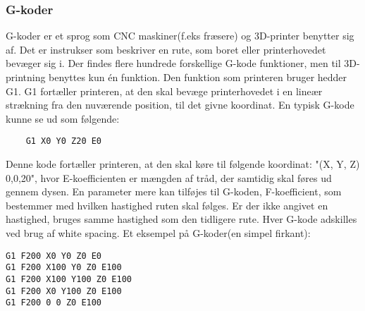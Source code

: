 
\subsubsection{G-koder} %
\label{ssub:g_koder}

G-koder er et sprog som CNC maskiner(f.eks fræsere) og 3D-printer benytter sig af. Det er instrukser som beskriver en rute, som boret eller printerhovedet bevæger sig i. \cite{_g-code_2013} 
Der findes flere hundrede forskellige G-kode funktioner, men til 3D-printning benyttes kun én funktion. Den funktion som printeren bruger hedder G1. G1 fortæller printeren, at den skal bevæge printerhovedet i en lineær strækning fra den nuværende position, til det givne koordinat.
En typisk G-kode kunne se ud som følgende: 

\begin{verbatim}
	G1 X0 Y0 Z20 E0
\end{verbatim}


Denne kode fortæller printeren, at den skal køre til følgende koordinat: "(X, Y, Z) 0,0,20", hvor E-koefficienten er mængden af tråd, der samtidig skal føres ud gennem dysen.
En parameter mere kan tilføjes til G-koden, F-koefficient, som bestemmer med hvilken hastighed ruten skal følges. Er der ikke angivet en hastighed, bruges samme hastighed som den tidligere rute. 
Hver G-kode adskilles ved brug af white spacing.
Et eksempel på G-koder(en simpel firkant):
\begin{lstlisting}
G1 F200 X0 Y0 Z0 E0
G1 F200 X100 Y0 Z0 E100
G1 F200 X100 Y100 Z0 E100
G1 F200 X0 Y100 Z0 E100
G1 F200 0 0 Z0 E100
\end{lstlisting}
